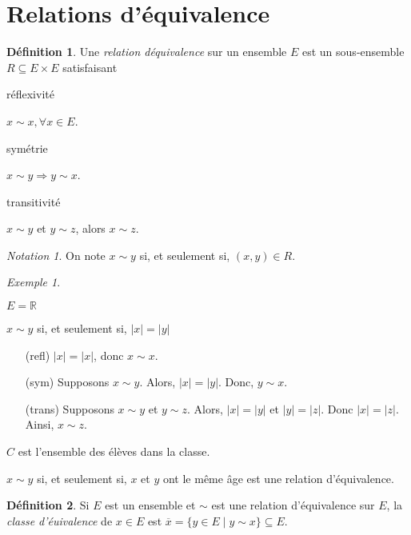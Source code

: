 \documentclass{report}
\newcommand*{\abs}[1]{\left| #1 \right|}
\newcommand*{\reels}{\mathbb{R}}
\theoremstyle{definition}
\newtheorem*{defin}{D\'efinition}
\theoremstyle{remark}
\newtheorem*{exem}{Exemple}
\newtheorem*{nota}{Notation}
\begin{document}
	\section{Relations d'\'equivalence}
	\begin{defin}
		Une \emph{relation d\'equivalence} sur un ensemble $E$ est un sous-ensemble $R \subseteq E \times E$ satisfaisant
		\begin{nlist}
			\item r\'eflexivit\'e

			$x \sim x, \forall x \in E$.
			\item sym\'etrie

			$x \sim y \Rightarrow y \sim x$.
			\item transitivit\'e

			$x \sim y$ et $y \sim z$, alors $x \sim z$.
		\end{nlist}
		\begin{nota}
			On note $x \sim y$ si, et seulement si, $(x,y) \in R$.
		\end{nota}
	\end{defin}
	\begin{exem}~

		\begin{nlist}
			\item $E = \reels$

			$x \sim y$ si, et seulement si, $\abs{x} = \abs{y}$
			\begin{itemize}
				\item[(refl)] $\abs{x} = \abs{x}$, donc $x \sim x$.
				\item[(sym)] Supposons $x \sim y$. Alors, $\abs{x} = \abs{y}$. Donc, $y \sim x$.
				\item[(trans)] Supposons $x \sim y$ et $y \sim z$. Alors, $\abs{x} = \abs{y}$ et $\abs{y} = \abs{z}$. Donc $\abs{x} = \abs{z}$. Ainsi, $x \sim z$.
			\end{itemize}
			\item $C$ est l'ensemble des \'el\`eves dans la classe.

			$x \sim y$ si, et seulement si, $x$ et $y$ ont le m\^eme \^age est une relation d'\'equivalence.
		\end{nlist}
	\end{exem}
	\begin{defin}
		Si $E$ est un ensemble et $\sim$ est une relation d'\'equivalence sur $E$, la \emph{classe d'\'euivalence} de $x \in E$ est $\overline{x} = \{y \in E \mid y \sim x\} \subseteq E$.
	\end{defin}
\end{document}
